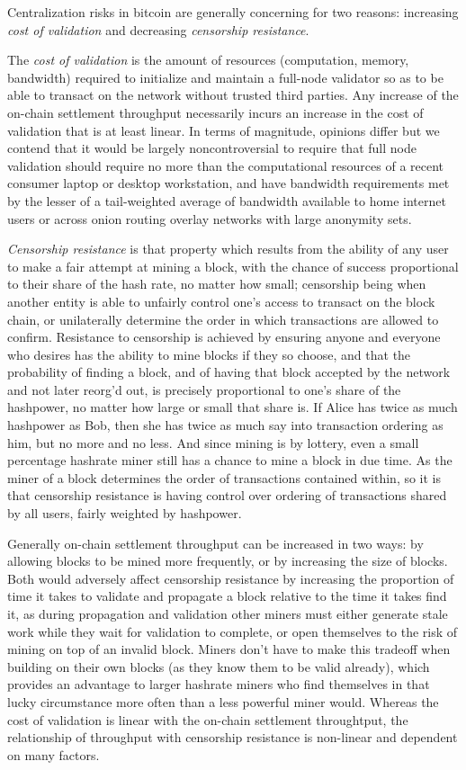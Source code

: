Centralization risks in bitcoin are generally concerning for two
reasons: increasing \emph{cost of validation} and decreasing
\emph{censorship resistance}.

The \emph{cost of validation} is the amount of resources (computation,
memory, bandwidth) required to initialize and maintain a full-node
validator so as to be able to transact on the network without trusted
third parties.  Any increase of the on-chain settlement throughput
necessarily incurs an increase in the cost of validation that is at
least linear.  In terms of magnitude, opinions differ but we contend
that it would be largely noncontroversial to require that full node
validation should require no more than the computational resources of
a recent consumer laptop or desktop workstation, and have bandwidth
requirements met by the lesser of a tail-weighted average of bandwidth
available to home internet users or across onion routing overlay
networks with large anonymity sets.

\emph{Censorship resistance} is that property which results from the
ability of any user to make a fair attempt at mining a block, with the
chance of success proportional to their share of the hash rate, no
matter how small; censorship being when another entity is able to
unfairly control one's access to transact on the block chain, or
unilaterally determine the order in which transactions are allowed to
confirm.  Resistance to censorship is achieved by ensuring anyone and
everyone who desires has the ability to mine blocks if they so choose,
and that the probability of finding a block, and of having that block
accepted by the network and not later reorg'd out, is precisely
proportional to one's share of the hashpower, no matter how large or
small that share is.  If Alice has twice as much hashpower as Bob,
then she has twice as much say into transaction ordering as him, but
no more and no less.  And since mining is by lottery, even a small
percentage hashrate miner still has a chance to mine a block in due
time.  As the miner of a block determines the order of transactions
contained within, so it is that censorship resistance is having
control over ordering of transactions shared by all users, fairly
weighted by hashpower.

Generally on-chain settlement throughput can be increased in two ways:
by allowing blocks to be mined more frequently, or by increasing the
size of blocks.  Both would adversely affect censorship resistance by
increasing the proportion of time it takes to validate and propagate a
block relative to the time it takes find it, as during propagation and
validation other miners must either generate stale work while they
wait for validation to complete, or open themselves to the risk of
mining on top of an invalid block.  Miners don't have to make this
tradeoff when building on their own blocks (as they know them to be
valid already), which provides an advantage to larger hashrate miners
who find themselves in that lucky circumstance more often than a less
powerful miner would.  Whereas the cost of validation is linear with
the on-chain settlement throughtput, the relationship of throughput
with censorship resistance is non-linear and dependent on many
factors.

